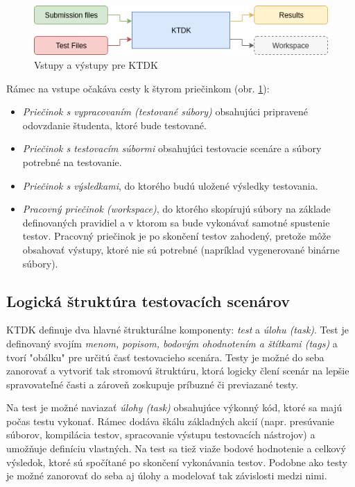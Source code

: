 \documentclass[
  digital, %
  oneside, %
  table,   %
  lof,     %
  lot,   %
]{fithesis3}
\begin{document}
\begin{figure}[!ht]
  \begin{center}
    \includegraphics[width=\textwidth]{imgs/ktdk-io.png}
  \end{center}
    \caption{Vstupy a výstupy pre KTDK}
    \label{fig:ktdk-io}
\end{figure}

Rámec na vstupe očakáva cesty k štyrom priečinkom (obr. \ref{fig:ktdk-io}):
\begin{itemize}
    \item \emph{Priečinok s vypracovaním (testované súbory)} obsahujúci pripravené odovzdanie študenta, ktoré bude testované.
    \item \emph{Priečinok s testovacím súbormi} obsahujúci testovacie scenáre a súbory potrebné na testovanie.
    \item \emph{Priečinok s výsledkami}, do ktorého budú uložené výsledky testovania.
    \item \emph{Pracovný priečinok (workspace)}, do ktorého skopírujú súbory na základe definovaných pravidiel a v ktorom sa bude vykonávať samotné spustenie testov. Pracovný priečinok je po skončení testov zahodený, pretože môže obsahovať výstupy, ktoré nie sú potrebné (napríklad vygenerované binárne súbory).
\end{itemize}

\subsection{Logická štruktúra testovacích scenárov}
\label{design-struct-test-scenarios}
KTDK definuje dva hlavné štrukturálne komponenty: \emph{test} a \emph{úlohu (task)}. Test je definovaný svojím \emph{menom, popisom, bodovým ohodnotením a štítkami (\emph{tags})} a tvorí "obálku" pre určitú časť testovacieho scenára. Testy je možné do seba zanorovať a vytvoriť tak stromovú štruktúru, ktorá logicky člení scenár na lepšie spravovateľné časti a zároveň zoskupuje príbuzné či previazané testy. 

Na test je možné naviazať \emph{úlohy (task)} obsahujúce výkonný kód, ktoré sa majú počas testu vykonať. Rámec dodáva škálu základných akcií (napr. presúvanie súborov, kompilácia testov, spracovanie výstupu testovacích nástrojov) a umožňuje definíciu vlastných. Na test sa tiež viaže bodové hodnotenie a celkový výsledok, ktoré sú spočítané po skončení vykonávania testov. Podobne ako testy je možné zanorovať do seba aj úlohy a modelovať tak závislosti medzi nimi.
\end{document}
